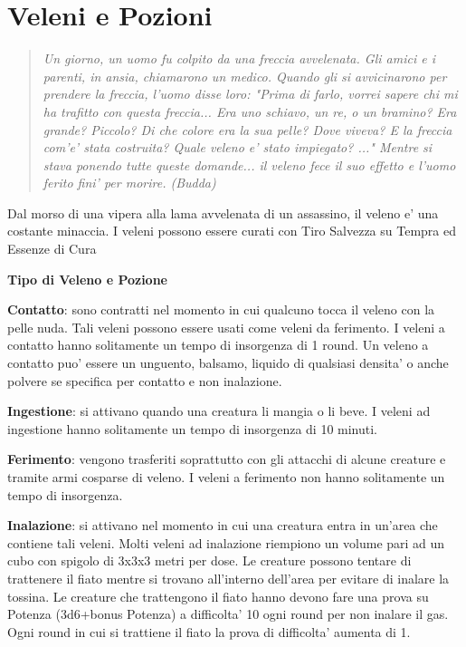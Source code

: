 \documentclass[a4paper,11pt,twoside,openany]{book}
\begin{document}
{		\pagebreak
		
		
		\section{Veleni e Pozioni}
		
		\label{veleni-e-pozioni}
		
		
		\begin{quote}\textit{
				Un giorno, un uomo fu colpito da una freccia avvelenata. Gli amici e i parenti, in ansia, chiamarono un medico. Quando gli si avvicinarono per prendere la freccia, l'uomo disse loro: "Prima di farlo, vorrei sapere chi mi ha trafitto con questa freccia... Era uno schiavo, un re, o un bramino? Era grande? Piccolo? Di che colore era la sua pelle? Dove viveva? E la freccia com'e' stata costruita? Quale veleno e' stato impiegato? ..." Mentre si stava ponendo tutte queste domande... il veleno fece il suo effetto e l'uomo ferito fini' per morire. (Budda)
		}\end{quote}
		
		
		Dal morso di una vipera alla lama avvelenata di un assassino, il veleno e' una costante minaccia. I veleni possono essere curati con Tiro Salvezza su Tempra ed Essenze di Cura
		
		\bigskip
		
		\textbf{Tipo di Veleno e Pozione}
		
		\textbf{Contatto}: sono contratti nel momento in cui qualcuno tocca il veleno con la pelle nuda. Tali veleni possono essere usati come veleni da ferimento. I veleni a contatto hanno solitamente un tempo di insorgenza di 1 round. Un veleno a contatto puo' essere un unguento, balsamo, liquido di qualsiasi densita' o anche polvere se specifica per contatto e non inalazione.
		
		\textbf{Ingestione}: si attivano quando una creatura li mangia o li beve. I veleni ad ingestione hanno solitamente un tempo di insorgenza di 10 minuti.
		
		\textbf{Ferimento}: vengono trasferiti soprattutto con gli attacchi di alcune creature e tramite armi cosparse di veleno. I veleni a ferimento non hanno solitamente un tempo di insorgenza. 
		
		\textbf{Inalazione}: si attivano nel momento in cui una creatura entra in un'area che contiene tali veleni. Molti veleni ad inalazione riempiono un volume pari ad un cubo con spigolo di 3x3x3 metri per dose. Le creature possono tentare di trattenere il fiato mentre si trovano all'interno dell'area per evitare di inalare la tossina. Le creature che trattengono il fiato hanno devono fare una prova su Potenza (3d6+bonus Potenza) a difficolta' 10 ogni round per non inalare il gas. Ogni round in cui si trattiene il fiato la prova di difficolta' aumenta di 1.
		
}
\end{document}
